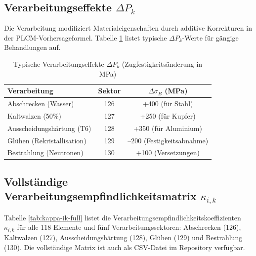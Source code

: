\documentclass[12pt,a4paper]{article}
\begin{document}
\subsection{Verarbeitungseffekte \(\Delta P_k\)}
\label{sec:processing}

Die Verarbeitung modifiziert Materialeigenschaften durch additive Korrekturen in der PLCM-Vorhersageformel. Tabelle \ref{tab:processing-effects} listet typische \(\Delta P_k\)-Werte für gängige Behandlungen auf.

\begin{table}[htbp]
	\centering
	\caption{Typische Verarbeitungseffekte \(\Delta P_k\) (Zugfestigkeitsänderung in MPa)}
	\label{tab:processing-effects}
	\begin{tabular}{lcc}
		\toprule
		Verarbeitung & Sektor & \(\Delta \sigma_B\) (MPa) \\
		\midrule
		Abschrecken (Wasser) & 126 & +400 (für Stahl) \\
		Kaltwalzen (50\%) & 127 & +250 (für Kupfer) \\
		Ausscheidungshärtung (T6) & 128 & +350 (für Aluminium) \\
		Glühen (Rekristallisation) & 129 & –200 (Festigkeitsabnahme) \\
		Bestrahlung (Neutronen) & 130 & +100 (Versetzungen) \\
		\bottomrule
	\end{tabular}
\end{table}

\subsection{Vollständige Verarbeitungsempfindlichkeitsmatrix \(\kappa_{i,k}\)}
\label{subsec:full-kappa-ik}

Tabelle \ref{tab:kappa-ik-full} listet die Verarbeitungsempfindlichkeitskoeffizienten \(\kappa_{i,k}\) für alle 118 Elemente und fünf Verarbeitungssektoren: Abschrecken (126), Kaltwalzen (127), Ausscheidungshärtung (128), Glühen (129) und Bestrahlung (130). Die vollständige Matrix ist auch als CSV-Datei im Repository verfügbar.
\end{document}
